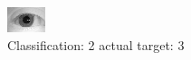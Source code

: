 \begin{figure}[h!]
\begin{center}
\includegraphics[width=0.60\columnwidth]{figures/ID1099_class_2_target_3.png}
\end{center}
\caption{ Classification: 2 actual target: 3}
\label{fig:ID1099_class_2_target_3}
\end{figure}
